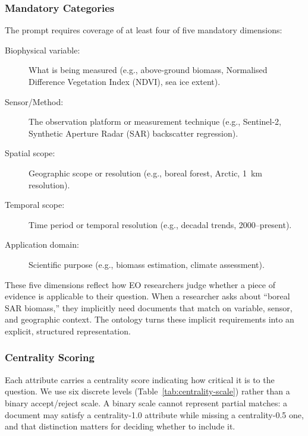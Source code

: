 \subsubsection{Mandatory Categories}
\label{subsubsec:mandatory-categories}

The prompt requires coverage of at least four of five mandatory dimensions:

\begin{description}
\item[Biophysical variable:] What is being measured (e.g., above-ground biomass, Normalised Difference Vegetation Index (NDVI), sea ice extent).
\item[Sensor/Method:] The observation platform or measurement technique (e.g., Sentinel-2, Synthetic Aperture Radar (SAR) backscatter regression).
\item[Spatial scope:] Geographic scope or resolution (e.g., boreal forest, Arctic, 1~km resolution).
\item[Temporal scope:] Time period or temporal resolution (e.g., decadal trends, 2000--present).
\item[Application domain:] Scientific purpose (e.g., biomass estimation, climate assessment).
\end{description}

These five dimensions reflect how EO researchers judge whether a piece of evidence is applicable to their question. When a researcher asks about ``boreal SAR biomass,'' they implicitly need documents that match on variable, sensor, and geographic context. The ontology turns these implicit requirements into an explicit, structured representation.

\subsubsection{Centrality Scoring}
\label{subsubsec:centrality-scoring}

Each attribute carries a centrality score indicating how critical it is to the question. We use six discrete levels (Table~\ref{tab:centrality-scale}) rather than a binary accept/reject scale. A binary scale cannot represent partial matches: a document may satisfy a centrality-1.0 attribute while missing a centrality-0.5 one, and that distinction matters for deciding whether to include it.

